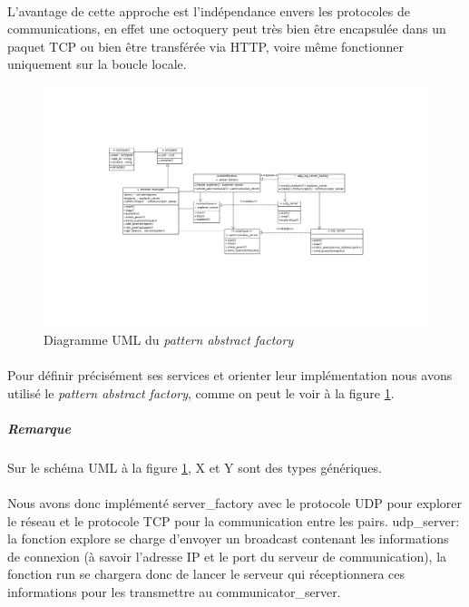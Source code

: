 \documentclass[a4paper]{article}
\begin{document}
			\paragraph{}{
			L’avantage de cette approche est l’indépendance envers les protocoles de communications, en effet
			une octoquery peut très bien être encapsulée dans un paquet TCP ou bien être transférée via HTTP,
			 voire même fonctionner uniquement sur la boucle locale.
			}
			
			\begin{figure}[!h]
					\centering
					\includegraphics[scale=0.5]{UML/octonet_factory1.png}
					\caption{\label{factory_uml} Diagramme UML du \textit{pattern abstract factory}}
			\end{figure}
						
			
			\paragraph{}{
			Pour définir précisément ses services et orienter leur implémentation nous avons utilisé le
			\textit{pattern abstract factory}, comme on peut le voir à la figure \ref{factory_uml}.
			}
				\subparagraph{Remarque}{Sur le schéma UML à la figure \ref{factory_uml}, X et Y sont des types génériques.}
				
			\paragraph{}{
			Nous avons donc implémenté server\_factory avec le protocole UDP pour explorer le réseau et le
			protocole TCP pour la communication entre les pairs. \newline
			udp\_server: la fonction explore se charge d’envoyer un broadcast contenant les informations de
			connexion (à savoir l’adresse IP et le port du serveur de communication), la fonction run 
			se chargera donc de lancer le serveur qui réceptionnera ces informations pour les
			transmettre au communicator\_server.
			}
			
\end{document}
